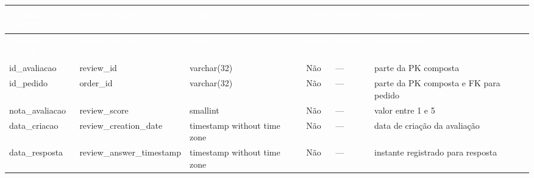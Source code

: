 \documentclass[12pt,a4paper]{article}
\begin{document}
{		
		{\small 
			\renewcommand{\arraystretch}{1.18}
			
			\begin{longtable}{
					|>{\raggedright\arraybackslash}p{2.5cm}|
					>{\raggedright\arraybackslash}p{3cm}|
					>{\raggedright\arraybackslash}p{2cm}|
					>{\centering\arraybackslash}p{1cm}|
					>{\raggedright\arraybackslash}p{1.2cm}|
					>{\raggedright\arraybackslash}p{3cm}|
				}
				
				\hline
				\rowcolor{AzulCorporativo}
				
				\textcolor{white}{\textbf{Coluna CORE}} &
				\textcolor{white}{\textbf{Coluna origem}} &
				\textcolor{white}{\textbf{Tipo}} &
				\textcolor{white}{\textbf{Nulo}} &
				\textcolor{white}{\textbf{Padrão}} &
				\textcolor{white}{\textbf{Integridade}}
				\\ \hline
				
				\endfirsthead
				
				\hline
				\rowcolor{AzulCorporativo}
				
				\textcolor{white}{\textbf{Coluna CORE}} &
				\textcolor{white}{\textbf{Coluna origem}} &
				\textcolor{white}{\textbf{Tipo}} &
				\textcolor{white}{\textbf{Nulo}} &
				\textcolor{white}{\textbf{Padrão}} &
				\textcolor{white}{\textbf{Integridade}}
				\\ \hline
				
				\endhead
				
				id\_avaliacao
				&
				review\_id
				&
				varchar(32)
				&
				Não
				&
				---
				&
				parte da PK composta
				\\ \hline
				
				id\_pedido
				&
				order\_id
				&
				varchar(32)
				&
				Não
				&
				---
				&
				parte da PK composta e FK para pedido
				\\ \hline
				
				nota\_avaliacao
				&
				review\_score
				&
				smallint
				&
				Não
				&
				---
				&
				valor entre 1 e 5
				\\ \hline
				
				data\_criacao
				&
				review\_creation\_\allowbreak date
				&
				timestamp without time zone
				&
				Não
				&
				---
				&
				data de criação da avaliação
				\\ \hline
				
				data\_resposta
				&
				review\_answer\_\allowbreak timestamp
				&
				timestamp without time zone
				&
				Não
				&
				---
				&
				instante registrado para resposta
				\\ \hline
				

\end{longtable}}}
\end{document}
